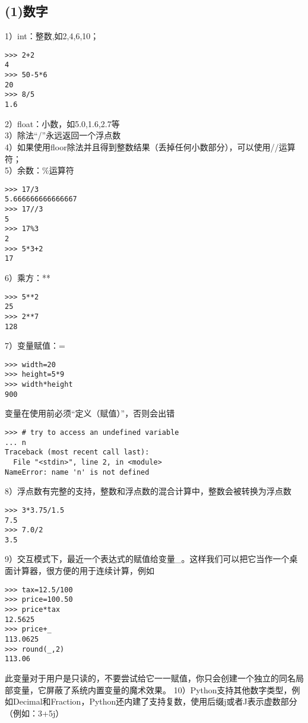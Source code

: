 \documentclass{article}
\begin{document}
\begin{CJK}{UTF8}{gbsn}
\subsection*{(1)数字}
1）int：整数,如2,4,6,10；
\begin{verbatim}
>>> 2+2
4
>>> 50-5*6
20
>>> 8/5
1.6
\end{verbatim}
2）float：小数，如5.0,1.6,2.7等\\
3）除法“/”永远返回一个浮点数\\
4）如果使用floor除法并且得到整数结果（丢掉任何小数部分），可以使用//运算符；\\
5）余数：\%{}运算符
\begin{verbatim}
>>> 17/3
5.666666666666667
>>> 17//3
5
>>> 17%3
2
>>> 5*3+2
17
\end{verbatim}
6）乘方：**
\begin{verbatim}
>>> 5**2
25
>>> 2**7
128
\end{verbatim}
7）变量赋值：=
\begin{verbatim}
>>> width=20
>>> height=5*9
>>> width*height
900
\end{verbatim}
变量在使用前必须“定义（赋值）”，否则会出错
\begin{verbatim}
>>> # try to access an undefined variable
... n
Traceback (most recent call last):
  File "<stdin>", line 2, in <module>
NameError: name 'n' is not defined
\end{verbatim}
8）浮点数有完整的支持，整数和浮点数的混合计算中，整数会被转换为浮点数
\begin{verbatim}
>>> 3*3.75/1.5
7.5
>>> 7.0/2
3.5
\end{verbatim}
9）交互模式下，最近一个表达式的赋值给变量\_{}。这样我们可以把它当作一个桌面计算器，很方便的用于连续计算，例如
\begin{verbatim}
>>> tax=12.5/100
>>> price=100.50
>>> price*tax
12.5625
>>> price+_
113.0625
>>> round(_,2)
113.06
\end{verbatim}
此变量对于用户是只读的，不要尝试给它一一赋值，你只会创建一个独立的同名局部变量，它屏蔽了系统内置变量的魔术效果。
10）Python支持其他数字类型，例如Decimal和Fraction，Python还内建了支持复数，使用后缀j或者J表示虚数部分（例如：3+5j）

\end{CJK}
\end{document}
